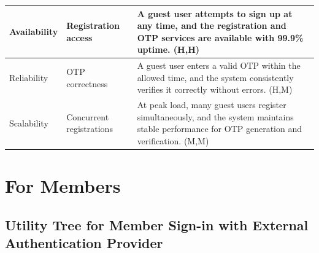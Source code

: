 \documentclass{article}
\begin{document}
\begin{table}[H]
\begin{tabular}{|p{3cm}|p{4cm}|p{7cm}|}
        Availability
                                   & Registration access
                                   & A guest user attempts to sign up at any time, and the registration and OTP services are available with 99.9\% uptime. (H,H)                                                   \\
        \hline

        Reliability
                                   & OTP correctness
                                   & A guest user enters a valid OTP within the allowed time, and the system consistently verifies it correctly without errors. (H,M)                                              \\
        \hline

        Scalability
                                   & Concurrent registrations
                                   & At peak load, many guest users register simultaneously, and the system maintains stable performance for OTP generation and verification. (M,M)                                \\
        \hline
    \end{tabular}
\end{table}

\section{For Members}

\subsection{Utility Tree for Member Sign-in with External Authentication Provider}
\end{document}
